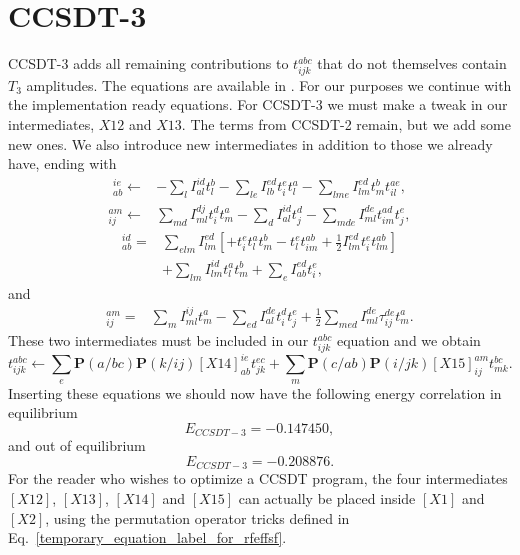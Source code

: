 \section{CCSDT-3}
CCSDT-3 adds all remaining contributions to $t_{ijk}^{abc}$ that do
not themselves contain $T_3$ amplitudes. The equations are available
in \cite{CCSDT-ref4}. For our purposes we continue with the
implementation ready equations. For CCSDT-3 we must make a tweak in
our intermediates, $X12$ and $X13$. The terms from CCSDT-2 remain, but we
add some new ones. We also introduce new intermediates  in addition to those we already have, ending with
\begin{align}
[X12]_{ab}^{ie} \leftarrow  & - \sum_l I_{al}^{id} t_l^b - \sum_{le} I_{lb}^{ed} t_i^e t_l^a - \sum_{lme} I_{lm}^{ed} t_m^b t_{il}^{ae},
\end{align}
\begin{align}
[X13]_{ij}^{am} \leftarrow & 
\sum_{md} I_{ml}^{dj} t_i^d t_m^a
- \sum_d I_{al}^{id} t_j^d
- \sum_{mde} I_{ml}^{de} t_{im}^{ad} t_j^e,
\end{align}
\begin{align}
[X14]_{ab}^{id} = & 
\sum_{elm} I_{lm}^{ed} \left[
+ t_i^e t_l^a t_m^b
- t_l^e t_{im}^{ab} 
+ \frac{1}{2} I_{lm}^{ed} t_i^e t_{lm}^{ab}
\right]
\nonumber \\ &
+ \sum_{lm} I_{lm}^{id} t_l^a t_m^b
+ \sum_e I_{ab}^{ed} t_i^e,
\end{align}
and 
\begin{align}
[X15]_{ij}^{am} = &
\sum_m I_{ml}^{ij} t_m^a
- \sum_{ed} I_{al}^{de} t_i^d t_j^e
+ \frac{1}{2} \sum_{med} I_{ml}^{de} \tau_{ij}^{de} t_m^a  .
\end{align}
These two intermediates must be included in our $t_{ijk}^{abc}$ equation and we obtain
\begin{equation}
t_{ijk}^{abc} \leftarrow
\sum_e \textbf{P}(a/bc) \textbf{P}(k/ij)
[X14]_{ab}^{ie} t_{jk}^{ec}
+ \sum_m \textbf{P}(c/ab) \textbf{P}(i/jk)
[X15]_{ij}^{am} t_{mk}^{bc} .
\end{equation}
Inserting these equations we should now have the following energy correlation in equilibrium
\begin{equation}
E_{CCSDT-3} = -0.147450,
\end{equation}
and out of  equilibrium
\begin{equation}
E_{CCSDT-3} = -0.208876 .
\end{equation}
For the reader who wishes to optimize a CCSDT program, the four
intermediates $[X12]$, $[X13]$, $[X14]$ and $[X15]$ can actually be placed
inside $[X1]$ and $[X2]$, using the permutation operator tricks defined in
Eq.~\eqref{temporary_equation_label_for_rfeffsf}. \\

